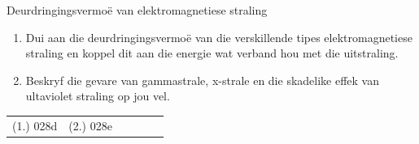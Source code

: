             \begin{exercises}{Deurdringingsvermo\"e van e\-lek\-tro\-mag\-ne\-tie\-se straling}
            \nopagebreak
        \label{m38779*id189729}\begin{enumerate}[noitemsep, label=\textbf{\arabic*}. ] 
            \label{m38779*uid28}\item Dui aan die deurdringingsvermo\"e van die verskillende tipes e\-lek\-tro\-mag\-ne\-tie\-se straling en koppel dit aan die energie wat verband hou met die uitstraling. \newline
\label{m38779*uid29}\item Beskryf die gevare van gammastrale, x-strale en die skadelike effek van ultaviolet straling op jou vel. \newline
\end{enumerate}
    \label{m38779*cid8}
\practiceinfo
 \par \begin{tabular}[h]{cccccc}
 (1.) 028d  &  (2.) 028e  & \end{tabular}
\end{exercises}


